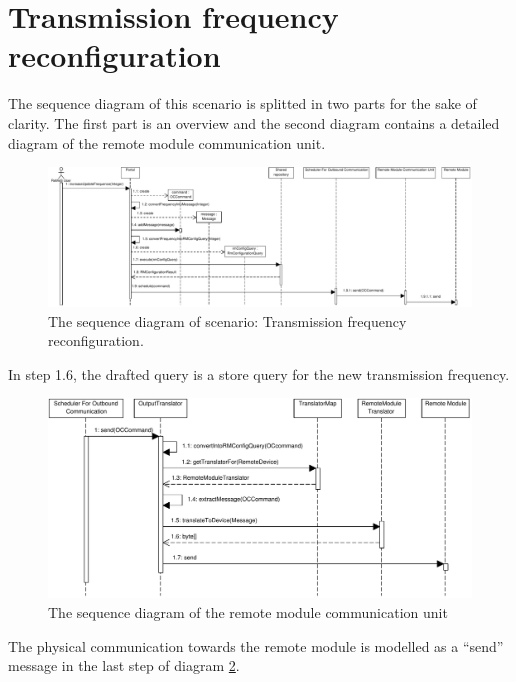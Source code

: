 \section{Transmission frequency reconfiguration}

\npar The sequence diagram of this scenario is splitted in two parts for the
sake of clarity. The first part is an overview and the second diagram
contains a detailed diagram of the remote module communication unit.

\begin{figure}
	\begin{centering}
		\includegraphics[width=1.4\textwidth,angle=90]{figs/scenario-5-3-2.pdf}
		\caption{The sequence diagram of scenario: Transmission frequency reconfiguration.}
		\label{fig:scenario-5-3-2}
	\end{centering}
\end{figure}

\npar In step 1.6, the drafted query is a store query for the new transmission
frequency. 

\begin{figure}
	\begin{centering}
		\includegraphics[width=\textwidth]{figs/scenario-5-3-2a.pdf}
		\caption{The sequence diagram of the remote module communication unit}
		\label{fig:scenario-5-3-2a}
	\end{centering}
\end{figure}

\npar The physical communication towards the remote module is modelled as a
``send'' message in the last step of diagram \ref{fig:scenario-5-3-2a}.
